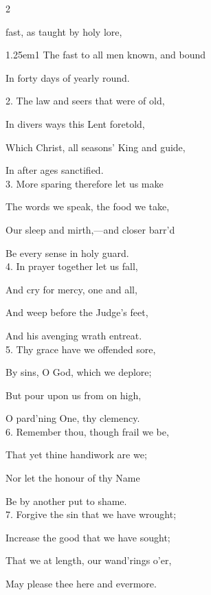 \begin{paracol}{2}

\mattinsInvitatoryHymn\label{FirstLentInvitatoryHymn}

 fast, as taught by holy lore,

\begin{hangparas}{1.25em}{1}
The fast to all men known, and bound
	
In forty days of yearly round.%

2. The law and seers that were of old,

In divers ways this Lent foretold,

Which Christ, all seasons’ King and guide,

In after ages sanctified.\\

3. More sparing therefore let us make

The words we speak, the food we take,

Our sleep and mirth,—and closer barr'd

Be every sense in holy guard.\\

4. In prayer together let us fall,

And cry for mercy, one and all,

And weep before the Judge’s feet,

And his avenging wrath entreat.\\

5. Thy grace have we offended sore,

By sins, O God, which we deplore;

But pour upon us from on high,

O pard'ning One, thy clemency.\\

6. Remember thou, though frail we be,

That yet thine handiwork are we;

Nor let the honour of thy Name

Be by another put to shame.\\

7. Forgive the sin that we have wrought;

Increase the good that we have sought;

That we at length, our wand'rings o’er,

May please thee here and evermore.\\


\end{hangparas}
\end{paracol}
